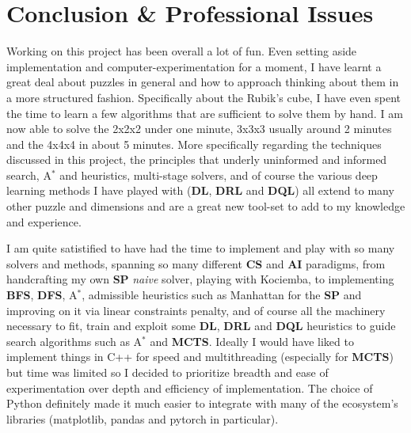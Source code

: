 
\chapter{Conclusion \& Professional Issues} %

\label{Conclusion} %



Working on this project has been overall a lot of fun. Even setting aside implementation and computer-experimentation for a moment, I have learnt a great deal about puzzles in general and how to approach thinking about them in a more structured fashion. Specifically about the Rubik's cube, I have even spent the time to learn a few algorithms that are sufficient to solve them by hand. I am now able to solve the 2x2x2 under one minute, 3x3x3 usually around 2 minutes and the 4x4x4 in about 5 minutes. More specifically regarding the techniques discussed in this project, the principles that underly uninformed and informed search, A$^{*}$ and heuristics, multi-stage solvers, and of course the various deep learning methods I have played with (\textbf{DL}, \textbf{DRL} and \textbf{DQL}) all extend to many other puzzle and dimensions and are a great new tool-set to add to my knowledge and experience.

I am quite satistified to have had the time to implement and play with so many solvers and methods, spanning so many different \textbf{CS} and \textbf{AI} paradigms, from handcrafting my own \textbf{SP} \textit{naive} solver, playing with Kociemba, to implementing \textbf{BFS}, \textbf{DFS}, A$^{*}$, admissible heuristics such as Manhattan for the \textbf{SP} and improving on it via linear constraints penalty, and of course all the machinery necessary to fit, train and exploit some \textbf{DL}, \textbf{DRL} and \textbf{DQL} heuristics to guide search algorithms such as  A$^{*}$ and \textbf{MCTS}. Ideally I would have liked to implement things in C++ for speed and multithreading (especially for \textbf{MCTS}) but time was limited so I decided to prioritize breadth and ease of experimentation over depth and efficiency of implementation. The choice of Python definitely made it much easier to integrate with many of the ecosystem's libraries (matplotlib, pandas and pytorch in particular).

